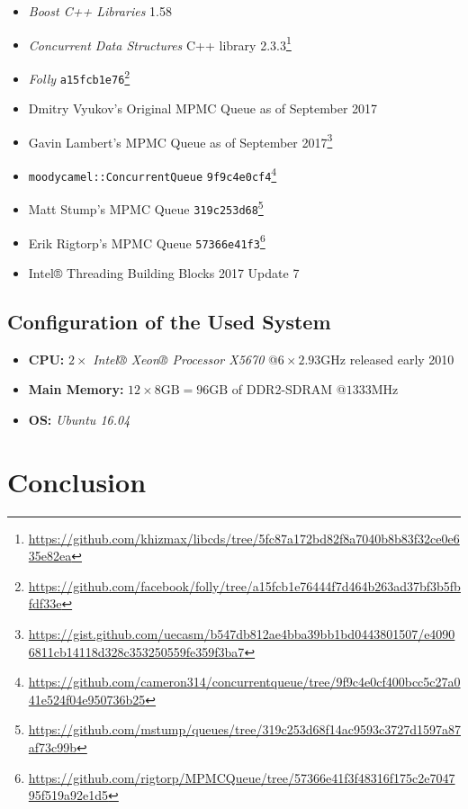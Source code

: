 \begin{@empty}
	\begin{itemize}
		\itemsep0em
		\item	\textit{Boost C++ Libraries} 1.58
		\item	\textit{Concurrent Data Structures} C++ library 2.3.3\footnote{\url{https://github.com/khizmax/libcds/tree/5fc87a172bd82f8a7040b8b83f32ce0e635e82ea}}
		\item	\textit{Folly} \lstinline{a15fcb1e76}\footnote{\url{https://github.com/facebook/folly/tree/a15fcb1e76444f7d464b263ad37bf3b5fbfdf33e}}
		\item	Dmitry Vyukov's Original MPMC Queue as of September 2017
		\item	Gavin Lambert's MPMC Queue as of September 2017\footnote{\url{https://gist.github.com/uecasm/b547db812ae4bba39bb1bd0443801507/e40906811cb14118d328c353250559fe359f3ba7}}
		\item	\lstinline{moodycamel::ConcurrentQueue} \lstinline{9f9c4e0cf4}\footnote{\url{https://github.com/cameron314/concurrentqueue/tree/9f9c4e0cf400bcc5c27a041e524f04e950736b25}}
		\item	Matt Stump's MPMC Queue \lstinline{319c253d68}\footnote{\url{https://github.com/mstump/queues/tree/319c253d68f14ac9593c3727d1597a87af73c99b}}
		\item	Erik Rigtorp's MPMC Queue \lstinline{57366e41f3}\footnote{\url{https://github.com/rigtorp/MPMCQueue/tree/57366e41f3f48316f175c2e704795f519a92e1d5}}
		\item	Intel® Threading Building Blocks 2017 Update 7
	\end{itemize}
\end{@empty}

\subsection[System Configuration]{Configuration of the Used System}

\begin{@empty}
	\begin{itemize}
		\itemsep0em
		\item	\textbf{CPU:} $2 \times $ \emph{Intel® Xeon® Processor X5670} @$6 \times 2.93\text{GHz}$ released early 2010
		\item	\textbf{Main Memory:} $12 \times 8\text{GB} = 96\text{GB}$ of DDR2-SDRAM @$1333\text{MHz}$
		\item	\textbf{OS:} \emph{Ubuntu 16.04}
	\end{itemize}
\end{@empty}

\section{Conclusion}
